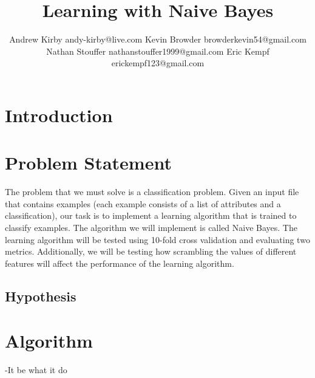 \documentclass[twoside,11pt]{article}
\begin{document}
\title{Learning with Naive Bayes}

\author{\name Andrew Kirby \email andy-kirby@live.com \AND
		\name Kevin Browder \email browderkevin54@gmail.com \AND
		\name Nathan Stouffer \email nathanstouffer1999@gmail.com \AND
		\name Eric Kempf \email erickempf123@gmail.com }

\editor{}

	
\maketitle

\begin{abstract}
	
\end{abstract}

\begin{keywords}
\end{keywords}

\section{Introduction}

\section{Problem Statement}

The problem that we must solve is a classification problem. Given an input file that contains examples (each example consists of a list of attributes and a classification), our task is to implement a learning algorithm that is trained to classify examples. The algorithm we will implement is called Naive Bayes. The learning algorithm will be tested using 10-fold cross validation and evaluating two metrics. Additionally, we will be testing how scrambling the values of different features will affect the performance of the learning algorithm.

\subsection{Hypothesis}

\section{Algorithm}

-It be what it do \newline
\end{document}
